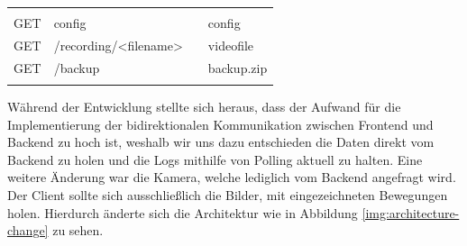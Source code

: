 \begin{table}[]
{\begin{tabular}{llll}
		&                                                                              &                                                                                                                                                                                                                                                        &                            \\
		GET           & config                                                                       &                                                                                                                                                                                                                                                        & config                     \\
		GET           & /recording/\textless{}filename\textgreater{}                                 &                                                                                                                                                                                                                                                        & videofile                  \\
		GET           & /backup                                                                      &                                                                                                                                                                                                                                                        & backup.zip                 \\
		&                                                                              &                                                                                                                                                                                                                                                        &                           
	\end{tabular}}
\end{table}
Während der Entwicklung stellte sich heraus, dass der Aufwand für die Implementierung der bidirektionalen Kommunikation zwischen Frontend und Backend zu hoch ist, weshalb wir uns dazu entschieden die Daten direkt vom Backend zu holen und die Logs mithilfe von Polling aktuell zu halten.
Eine weitere Änderung war die Kamera, welche lediglich vom Backend angefragt wird. Der Client sollte sich ausschließlich die Bilder, mit eingezeichneten Bewegungen holen.
Hierdurch änderte sich die Architektur wie in Abbildung \ref{img:architecture-change} zu sehen.\\

